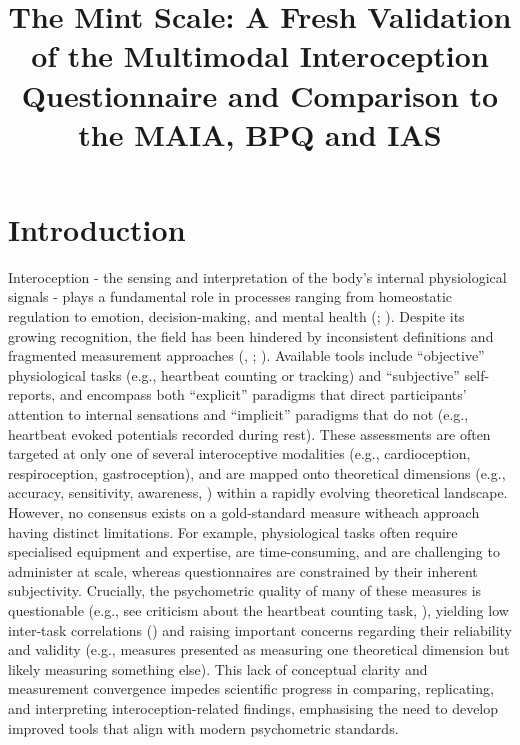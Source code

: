 \documentclass[
  jou,
  floatsintext,
  longtable,
  nolmodern,
  notxfonts,
  notimes,
  colorlinks=true,linkcolor=blue,citecolor=blue,urlcolor=blue]{apa7}
\title{\textbf{The Mint Scale: A Fresh Validation of the Multimodal
Interoception Questionnaire and Comparison to the MAIA, BPQ and IAS}}
\begin{document}
\maketitle



\setcounter{secnumdepth}{-\maxdimen} %

\setlength\LTleft{0pt}




\section{Introduction}\label{introduction}

Interoception - the sensing and interpretation of the body's internal
physiological signals - plays a fundamental role in processes ranging
from homeostatic regulation to emotion, decision-making, and mental
health (;
). Despite its growing recognition, the field has been hindered by
inconsistent definitions and fragmented measurement approaches
(,
;
). Available
tools include ``objective'' physiological tasks (e.g., heartbeat
counting or tracking) and ``subjective'' self-reports, and encompass
both ``explicit'' paradigms that direct participants' attention to
internal sensations and ``implicit'' paradigms that do not (e.g.,
heartbeat evoked potentials recorded during rest). These assessments are
often targeted at only one of several interoceptive modalities (e.g.,
cardioception, respiroception, gastroception), and are mapped onto
theoretical dimensions (e.g., accuracy, sensitivity, awareness,
) within a
rapidly evolving theoretical landscape. However, no consensus exists on
a gold-standard measure witheach approach having distinct limitations.
For example, physiological tasks often require specialised equipment and
expertise, are time-consuming, and are challenging to administer at
scale, whereas questionnaires are constrained by their inherent
subjectivity. Crucially, the psychometric quality of many of these
measures is questionable (e.g., see criticism about the heartbeat
counting task, ), yielding low inter-task correlations
() and raising
important concerns regarding their reliability and validity (e.g.,
measures presented as measuring one theoretical dimension but likely
measuring something else). This lack of conceptual clarity and
measurement convergence impedes scientific progress in comparing,
replicating, and interpreting interoception-related findings,
emphasising the need to develop improved tools that align with modern
psychometric standards.
\end{document}
